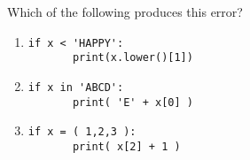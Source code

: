 \documentclass[12pt]{article}
\begin{document}
Which of the following produces this error?

\begin{enumerate}[label=\Alph*]
	\item
	\begin{lstlisting}[frame=single]
	if x < 'HAPPY':
	   print(x.lower()[1])
	   \end{lstlisting}
	\item
	\begin{lstlisting}[frame=single]
	if x in 'ABCD':
	   print( 'E' + x[0] )
	   \end{lstlisting}
	\item
	\begin{lstlisting}[frame=single]
	if x = ( 1,2,3 ):
	   print( x[2] + 1 )
	   \end{lstlisting}
\end{enumerate}
\end{document}
